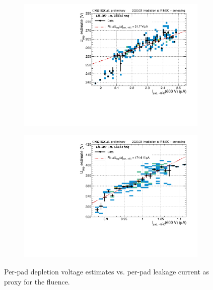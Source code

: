 \begin{figure}
	\captionsetup[subfigure]{aboveskip=-1pt,belowskip=-1pt}
	\centering
	\begin{subfigure}[b]{0.49\textwidth}
		\centering
		\includegraphics[width=0.999\textwidth]{plots/Vdep_vs_fluence/Vdep_vs_current_5414.pdf}
		\subcaption{
			}
			\label{plot:Vdep_vs_current_5414}
	\end{subfigure}
	\hfill
	\begin{subfigure}[b]{0.49\textwidth}
		\centering
		\includegraphics[width=0.999\textwidth]{plots/Vdep_vs_fluence/Vdep_vs_current_1002.pdf}
		\subcaption{
		}
		\label{plot:Vdep_vs_current_1002}
	\end{subfigure}	
	\caption{
		Per-pad depletion voltage estimates vs. per-pad leakage current as proxy for the fluence.
	}
\end{figure}


